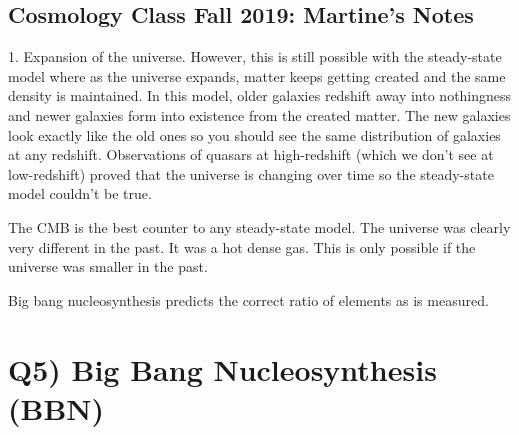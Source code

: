 \documentclass[\main/main.tex]{subfiles}
\begin{document}
	

	

    \subsection{Cosmology Class Fall 2019: Martine's Notes}

    1. Expansion of the universe. However, this is still possible with the steady-state model where as the universe expands, matter keeps getting created and the same density is maintained. In this model, older galaxies redshift away into nothingness and newer galaxies form into existence from the created matter. The new galaxies look exactly like the old ones so you should see the same distribution of galaxies at any redshift. Observations of quasars at high-redshift (which we don't see at low-redshift) proved that the universe is changing over time so the steady-state model couldn't be true.
    
    The CMB is the best counter to any steady-state model. The universe was clearly very different in the past. It was a hot dense gas. This is only possible if the universe was smaller in the past.
    
    Big bang nucleosynthesis predicts the correct ratio of elements as is measured.



\newpage
\section{Q5) Big Bang Nucleosynthesis (BBN)} %
\label{sec:q5_big_bang_nucleosynthesis_bbn}
\end{document}
